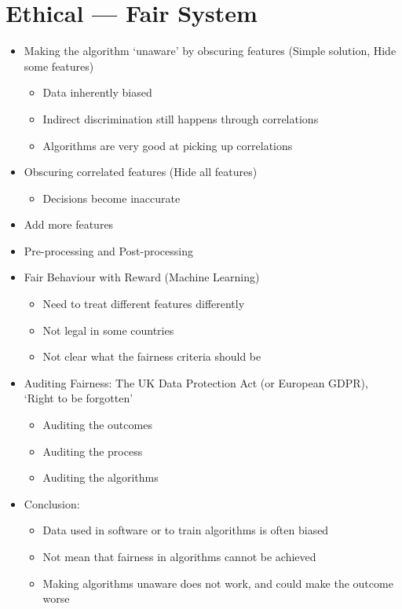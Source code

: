 \documentclass[12pt,openany]{book}
\begin{document}
\section{Ethical --- Fair System}
\begin{itemize}
    \item Making the algorithm `unaware' by obscuring features (Simple solution, Hide some features)
    \begin{itemize}
        \item Data inherently biased
        \item Indirect discrimination still happens through correlations
        \item Algorithms are very good at picking up correlations
    \end{itemize}
    \item Obscuring correlated features (Hide all features)
    \begin{itemize}
        \item Decisions become inaccurate
    \end{itemize}
    \item Add more features
    \item Pre-processing and Post-processing
    \item Fair Behaviour with Reward (Machine Learning)
    \begin{itemize}
        \item Need to treat different features differently
        \item Not legal in some countries
        \item Not clear what the fairness criteria should be
    \end{itemize}
    \item Auditing Fairness: The UK Data Protection Act (or European GDPR), `Right to be forgotten'
    \begin{itemize}
        \item Auditing the outcomes
        \item Auditing the process
        \item Auditing the algorithms
    \end{itemize}
    \item Conclusion:
    \begin{itemize}
        \item Data used in software or to train algorithms is often biased
        \item Not mean that fairness in algorithms cannot be achieved
        \item Making algorithms unaware does not work, and could make the outcome worse

\end{itemize}
\end{itemize}
\end{document}
